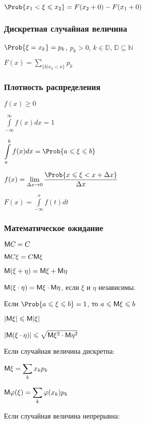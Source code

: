 $\displaystyle \Prob\{x_1 < \xi \leqslant x_2\} = F(x_2+0) - F(x_1+0) $

\subsubsection{Дискретная случайная величина}

$\Prob\{\xi = x_k\} = p_k $, $p_k > 0$, $k \in \mathbb{D}$, $\mathbb{D} \subseteq \mathbb{N}$

$\displaystyle F(x) = \sum_{\{ k | x_k < x\}} p_k $

\subsubsection{Плотность распределения}

$\displaystyle f(x) \geqslant 0 $

$\displaystyle \int\limits_{-\infty}^{\infty} f(x) dx = 1 $

$\displaystyle \int\limits_{a}^{b} f(x) dx = \Prob\{a\leqslant \xi \leqslant b\} $

$\displaystyle f(x) = \lim_{\Delta x\to 0} \frac{\Prob\{x\leqslant \xi < x + \Delta x\}}{\Delta x} $

$\displaystyle F(x) = \int\limits_{-\infty}^{x} f(t) dt $

\subsubsection{Математическое ожидание}

$\displaystyle \mathsf{M} C = C $

$\displaystyle \mathsf{M} C\xi = C \mathsf{M} \xi $

$\displaystyle \mathsf{M}(\xi + \eta) = \mathsf{M}\xi + \mathsf{M}\eta $

$\displaystyle \mathsf{M}(\xi\cdot\eta) = \mathsf{M}\xi \cdot \mathsf{M}\eta $, если $\xi$ и $\eta$ независимы.

Если $\displaystyle \Prob\{a\leqslant \xi \leqslant b\} = 1 $, то $a\leqslant \mathsf{M}\xi \leqslant b$

$\displaystyle |\mathsf{M}\xi| \leqslant \mathsf{M}|\xi| $

$\displaystyle |\mathsf{M}(\xi\cdot\eta)| \leqslant \sqrt{\mathsf{M}\xi^2\cdot\mathsf{M}\eta^2} $

Если случайная величина дискретна:

$\displaystyle \mathsf{M}\xi = \sum_k x_k p_k $

$\displaystyle \mathsf{M}\varphi(\xi) = \sum_k \varphi(x_k) p_k $

Если случайная величина непрерывна:

